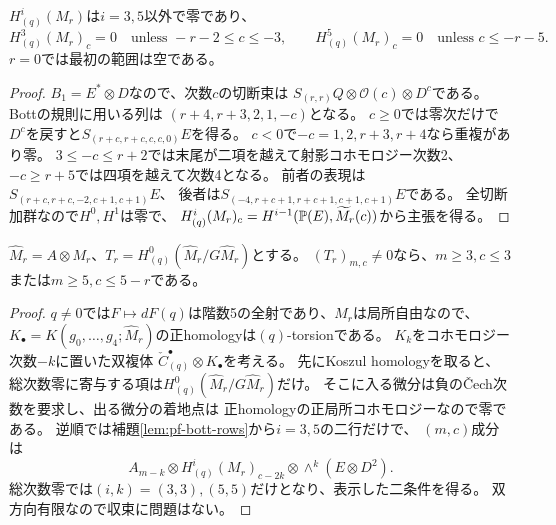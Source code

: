 \begin{lemma}[局所コホモロジーの二つの行]
\label{lem:pf-bott-rows}
$H^i_{(q)}(M_r)$は$i=3,5$以外で零であり、
\[
 H^3_{(q)}(M_r)_c=0\quad\text{unless }-r-2\le c\le-3,
 \qquad H^5_{(q)}(M_r)_c=0\quad\text{unless }c\le-r-5.
\]
$r=0$では最初の範囲は空である。
\end{lemma}
\begin{proof}
$B_1=E^*\otimes D$なので、次数$c$の切断束は
$S_{(r,r)}Q\otimes\mathcal O(c)\otimes D^c$である。
Bottの規則\cite[Theorem 2.2]{PfRWW}に用いる列は
$(r+4,r+3,2,1,-c)$となる。
$c\ge0$では零次だけで$D^c$を戻すと$S_{(r+c,r+c,c,c,0)}E$を得る。
$c<0$で$-c=1,2,r+3,r+4$なら重複があり零。
$3\le-c\le r+2$では末尾が二項を越えて射影コホモロジー次数2、
$-c\ge r+5$では四項を越えて次数4となる。
前者の表現は$S_{(r+c,r+c,-2,c+1,c+1)}E$、
後者は$S_{(-4,r+c+1,r+c+1,c+1,c+1)}E$である。
全切断加群なので$H^0,H^1$は零で、
$H^i_{(q)}(M_r)_c=H^{i-1}(\mathbb P(E),\widetilde M_r(c))$から主張を得る。
\end{proof}

\begin{lemma}
$\widehat M_r=A\otimes M_r$、$T_r=H^0_{(q)}(\widehat M_r/G\widehat M_r)$とする。
$(T_r)_{m,c}\ne0$なら、$m\ge3,c\le3$または$m\ge5,c\le5-r$である。
\end{lemma}
\begin{proof}
$q\ne0$では$F\mapsto dF(q)$は階数5の全射であり、$M_r$は局所自由なので、
$K_\bullet=K(g_0,\ldots,g_4;\widehat M_r)$の正homologyは$(q)$-torsionである。
$K_k$をコホモロジー次数$-k$に置いた双複体
$\check C^\bullet_{(q)}\otimes K_\bullet$を考える。
先にKoszul homologyを取ると、総次数零に寄与する項は$H^0_{(q)}(\widehat M_r/G\widehat M_r)$だけ。
そこに入る微分は負の\v{C}ech次数を要求し、出る微分の着地点は
正homologyの正局所コホモロジーなので零である。
逆順では補題\ref{lem:pf-bott-rows}から$i=3,5$の二行だけで、
$(m,c)$成分は
\[
 A_{m-k}\otimes H^i_{(q)}(M_r)_{c-2k}\otimes\wedge^k(E\otimes D^2).
\]
総次数零では$(i,k)=(3,3),(5,5)$だけとなり、表示した二条件を得る。
双方向有限なので収束に問題はない。
\end{proof}

